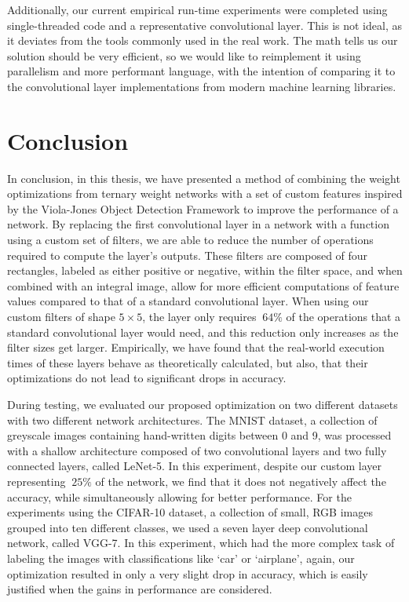 \documentclass[11pt,a4paper,oldfontcommands]{memoir}
\begin{document}
Additionally, our current empirical run-time experiments were completed using single-threaded code and a representative convolutional layer. This is not ideal, as it deviates from the tools commonly used in the real work. The math tells us our solution should be very efficient, so we would like to reimplement it using parallelism and more performant language, with the intention of comparing it to the convolutional layer implementations from modern machine learning libraries. 


\chapter{Conclusion}
In conclusion, in this thesis, we have presented a method of combining the weight optimizations from ternary weight networks with a set of custom features inspired by the Viola-Jones Object Detection Framework to improve the performance of a network. By replacing the first convolutional layer in a network with a function using a custom set of filters, we are able to reduce the number of operations required to compute the layer's outputs. These filters are composed of four rectangles, labeled as either positive or negative, within the filter space, and when combined with an integral image, allow for more efficient computations of feature values compared to that of a standard convolutional layer. When using our custom filters of shape $5\times5$, the layer only requires $~64\%$ of the operations that a standard convolutional layer would need, and this reduction only increases as the filter sizes get larger. Empirically, we have found that the real-world execution times of these layers behave as theoretically calculated, but also, that their optimizations do not lead to significant drops in accuracy.

During testing, we evaluated our proposed optimization on two different datasets with two different network architectures. The MNIST \cite{mnist} dataset, a collection of greyscale images containing hand-written digits between 0 and 9, was processed with a shallow architecture composed of two convolutional layers and two fully connected layers, called LeNet-5. In this experiment, despite our custom layer representing $~25\%$ of the network, we find that it does not negatively affect the accuracy, while simultaneously allowing for better performance. For the experiments using the CIFAR-10 dataset, a collection of small, RGB images grouped into ten different classes, we used a seven layer deep convolutional network, called VGG-7. In this experiment, which had the more complex task of labeling the images with classifications like `car' or `airplane', again, our optimization resulted in only a very slight drop in accuracy, which is easily justified when the gains in performance are considered.
\end{document}
